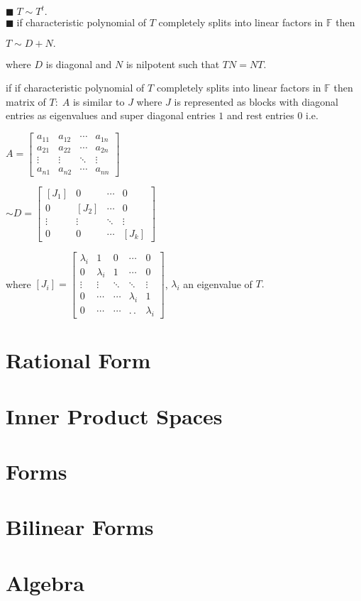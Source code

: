 \documentclass[11pt]{extarticle}
\newcommand{\F}{\mathbb{F}}
\newcommand{\ck}{.\,.\,}
\newcommand{\tbx}[2][]{
	\begin{tcolorbox}[enhanced,breakable,size=small,colback=black!2!white,title={#1},arc is angular, arc=1.5mm,drop fuzzy shadow]
		#2
	\end{tcolorbox}
}
\newcommand{\yi}{\\$\blacksquare\;$}
\begin{document}
\begin{multicols}{2}
{   	   			\yi $ T\sim T^t. $   	 
   	   			\yi if characteristic polynomial of $ T $ completely splits into linear factors in $ \F $ then 
   	   			\begin{center}
   	   				$ T\sim D+N .$
   	   				\end{center} where $ D $ is diagonal and $ N $ is nilpotent such that $ TN=NT $.	}
   	   	\tbx[matrix representation]{ if  if characteristic polynomial of $ T $ completely splits into linear factors in $ \F $ then matrix of $ T: \; A$  is similar to $ J $ where $ J $ is represented as blocks with diagonal entries as eigenvalues and super diagonal entries $ 1 $ and rest entries $ 0 $ i.e.}
   	   	\begin{flushleft}
   	   		$ A=\begin{bmatrix}
   	   			a_{11} & a_{12} & \cdots& a_{1n}\\
   	   			a_{21} & a_{22}& \cdots & a_{2n}\\
   	   			\vdots & \vdots & \ddots &\vdots\\
   	   			a_{n1}& a_{n2}&\cdots & a_{nn} 
   	   		\end{bmatrix}  $
   	   	\end{flushleft}
   	   	\begin{flushright}
   	   		$ 
   	   		\sim D=
   	   		\begin{bmatrix}
   	   			[J_{1}] & 0 & \cdots & 0\\
   	   			0& [J_{2}]& \cdots & 0\\
   	   			\vdots & \vdots & \ddots &\vdots\\
   	   			0& 0&\cdots & [J_{k}] 
   	   		\end{bmatrix}  $ 
   	   	\end{flushright} 
   	   		where $ [J_i] =\begin{bmatrix}
   	   		\lambda_i & 1 &0& \cdots &0\\
   	   		0 &	\lambda_i & 1 & \cdots &0\\
   	   		\vdots &\vdots & \ddots &\ddots &\vdots\\
   	   		0&\cdots & \cdots &\lambda_i &1\\
   	   		0&\cdots & \cdots & \ck&\lambda_i 
   	   		\end{bmatrix}$, $ \lambda_i $ an eigenvalue of $ T .$
   	   		
   	   	
   	\section{Rational Form}
   	

	\section{Inner Product Spaces}
	\section{Forms}
	\section{Bilinear Forms}
	\section{Algebra}
\end{multicols}
\end{document}

